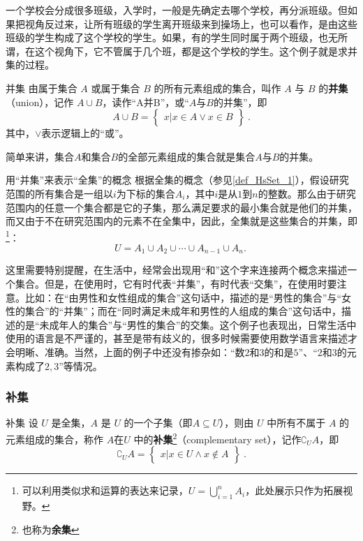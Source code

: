 一个学校会分成很多班级，入学时，一般是先确定去哪个学校，再分派班级。但如果把视角反过来，让所有班级的学生离开班级来到操场上，也可以看作，是由这些班级的学生构成了这个学校的学生。如果，有的学生同时属于两个班级，也无所谓，在这个视角下，它不管属于几个班，都是这个学校的学生。这个例子就是求并集的过程。

\begin{definition}{并集}
由属于集合 $A$ 或属于集合 $B$ 的所有元素组成的集合，叫作 $A$ 与 $B$ 的\textbf{并集}（union），记作 $A\cup B$，读作“A并B”，或“$A$与$B$的并集”，即
\begin{equation}
A\cup B = \begin{Bmatrix}x|x\in A \lor x\in B\end{Bmatrix}~.
\end{equation}
其中，$\lor$表示逻辑上的“或”。
\end{definition}

简单来讲，集合$A$和集合$B$的全部元素组成的集合就是集合$A$与$B$的并集。
\begin{example}{用“并集”来表示“全集”的概念}
根据全集的概念（参见\autoref{def_HsSet_1}），假设研究范围的所有集合是一组以$i$为下标的集合$A_i$，其中$i$是从$1$到$n$的整数。那么由于研究范围内的任意一个集合都是它的子集，那么满足要求的最小集合就是他们的并集，而又由于不在研究范围内的元素不在全集中，因此，全集就是这些集合的并集，即\footnote{可以利用类似求和运算的表达来记录，$\displaystyle U=\bigcup_{i=1}^n A_i$，此处展示只作为拓展视野。}：
$$
U=A_1\cup A_2\cup \cdots \cup A_{n-1}\cup A_n.~
$$
\end{example}
这里需要特别提醒，在生活中，经常会出现用“和”这个字来连接两个概念来描述一个集合。但是，在使用时，它有时代表“并集”，有时代表“交集”，在使用时要注意。比如：在“由男性和女性组成的集合”这句话中，描述的是“男性的集合”与“女性的集合”的“并集”；而在“同时满足未成年和男性的人组成的集合”这句话中，描述的是“未成年人的集合”与“男性的集合”的交集。这个例子也表现出，日常生活中使用的语言是不严谨的，甚至是带有歧义的，很多时候需要使用数学语言来描述才会明晰、准确。当然，上面的例子中还没有掺杂如：“数$2$和$3$的和是$5$”、“${2}$和${3}$的元素构成了${2,3}$”等情况。

\subsubsection{补集}

\begin{definition}{补集}
设 $U$ 是全集，$A$ 是 $U$ 的一个子集（即$A\subseteq U$），则由 $U$ 中所有不属于 $A$ 的元素组成的集合，称作 $A$在$U$ 中的\textbf{补集}\footnote{也称为\textbf{余集}}（complementary set），记作$\complement_UA$，即
\begin{equation}
\complement_UA = \begin{Bmatrix}x|x\in U \wedge x\notin A\end{Bmatrix}~.
\end{equation}
\end{definition}


